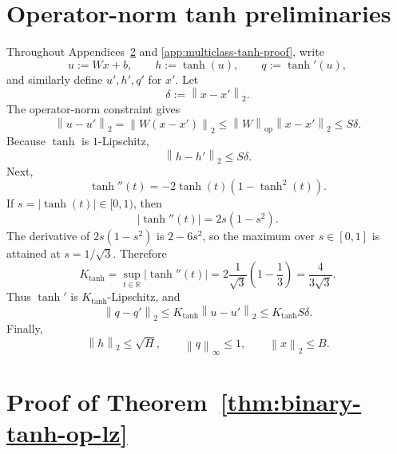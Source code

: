 \documentclass[conference,compsoc]{IEEEtran}
\newcommand{\R}{\mathbb{R}}
\newcommand{\op}{\mathrm{op}}
\newcommand{\norm}[1]{\left\lVert #1\right\rVert}
\begin{document}
\section{Operator-norm tanh preliminaries}
\label{app:tanh-preliminaries}

Throughout Appendices~\ref{app:binary-tanh-proof} and
\ref{app:multiclass-tanh-proof}, write
\[
u:=Wx+b,
\qquad
h:=\tanh(u),
\qquad
q:=\tanh'(u),
\]
and similarly define $u',h',q'$ for $x'$.  Let
\[
\delta:=\norm{x-x'}_2.
\]
The operator-norm constraint gives
\[
\norm{u-u'}_2
=
\norm{W(x-x')}_2
\le
\norm{W}_{\op}\norm{x-x'}_2
\le
S\delta.
\]
Because $\tanh$ is $1$-Lipschitz,
\begin{equation}
\label{eq:tanh-h-diff}
\norm{h-h'}_2\le S\delta.
\end{equation}
Next,
\[
\tanh''(t)=-2\tanh(t)(1-\tanh^2(t)).
\]
If $s=|\tanh(t)|\in[0,1)$, then
\[
|\tanh''(t)|=2s(1-s^2).
\]
The derivative of $2s(1-s^2)$ is $2-6s^2$, so the maximum over $s\in[0,1]$ is
attained at $s=1/\sqrt3$.  Therefore
\[
K_{\tanh}=
\sup_{t\in\R}|\tanh''(t)|
=
2\frac1{\sqrt3}\left(1-\frac13\right)
=
\frac4{3\sqrt3}.
\]
Thus $\tanh'$ is $K_{\tanh}$-Lipschitz, and
\begin{equation}
\label{eq:tanh-q-diff}
\norm{q-q'}_2
\le
K_{\tanh}\norm{u-u'}_2
\le
K_{\tanh}S\delta.
\end{equation}
Finally,
\[
\norm{h}_2\le\sqrt H,
\qquad
\norm{q}_\infty\le1,
\qquad
\norm{x}_2\le B.
\]

\section{Proof of Theorem~\ref{thm:binary-tanh-op-lz}}
\label{app:binary-tanh-proof}
\end{document}
